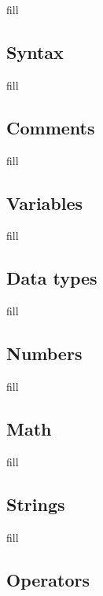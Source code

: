 \documentclass[
  b5paper]{book}
\begin{document}
fill

\hypertarget{syntax}{%
\subsection*{Syntax}\label{syntax}}

fill

\hypertarget{comments}{%
\subsection*{Comments}\label{comments}}

fill

\hypertarget{variables}{%
\subsection*{Variables}\label{variables}}

fill

\hypertarget{data-types}{%
\subsection*{Data types}\label{data-types}}

fill

\hypertarget{numbers}{%
\subsection*{Numbers}\label{numbers}}

fill

\hypertarget{math}{%
\subsection*{Math}\label{math}}

fill

\hypertarget{strings}{%
\subsection*{Strings}\label{strings}}

fill

\hypertarget{operators}{%
\subsection*{Operators}\label{operators}}
\end{document}
